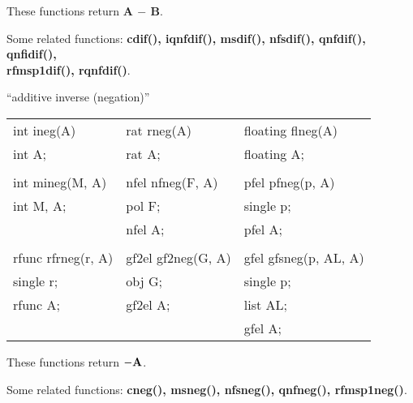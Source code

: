 These functions return {\bf A $-$ B}.

Some related functions:\hspace*{0.7em}
{\bf cdif(), iqnfdif(), msdif(), nfsdif(), qnfdif(), qnfidif(), \\
rfmsp1dif(), rqnfdif()}.

\newpage

\leer
\begin{center} ``additive inverse (negation)'' \end{center}
\begin{center}
{\bf
\begin{tabular}{lll}
int ineg(A) & rat rneg(A) & floating flneg(A)\\
int A;      & rat A;      & floating A;\\
&&\\
int mineg(M, A) & nfel nfneg(F, A) & pfel pfneg(p, A)\\
int M, A;       & pol F;           & single p;\\
                & nfel A;          & pfel A;\\
&&\\
rfunc rfrneg(r, A) & gf2el gf2neg(G, A) & gfel gfsneg(p, AL, A)\\
single r;          & obj G;             & single p;\\
rfunc A;           & gf2el A;           & list AL;\\
                   &                    & gfel A;\\[1.5ex]
\end{tabular} }
\end{center}

These functions return $-\mbox{\bf A}$.

Some related functions:\hspace*{0.7em}
{\bf cneg(), msneg(), nfsneg(), qnfneg(), rfmsp1neg()}.

